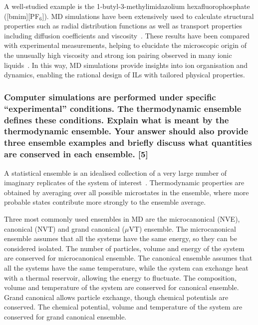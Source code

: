 \documentclass[a4paper,10pt,twocolumn]{article}
\begin{document}
A well-studied example is the 1-butyl-3-methylimidazolium hexafluorophosphate ([bmim][PF$_6$]). MD simulations have been extensively used to calculate structural properties such as radial distribution functions as well as transport properties including diffusion coefficients and viscosity~\cite{raju2009aqueous}. These results have been compared with experimental measurements, helping to elucidate the microscopic origin of the unusually high viscosity and strong ion pairing observed in many ionic liquids~\cite{zhao2008shear}. In this way, MD simulations provide insights into ion organisation and dynamics, enabling the rational design of ILs with tailored physical properties.


\subsubsection*{Computer simulations are performed under specific ``experimental'' conditions. The thermodynamic ensemble defines these conditions. Explain what is meant by the thermodynamic ensemble. Your answer should also provide three ensemble examples and briefly discuss what quantities are conserved in each ensemble. [5]}

A statistical ensemble is an idealised collection of a very large number of imaginary replicates of the system of interest~\cite{atkins2023atkins}. Thermodynamic properties are obtained by averaging over all possible microstates in the ensemble, where more probable states contribute more strongly to the ensemble average.

Three most commonly used ensembles in MD are the microcanonical (NVE), canonical (NVT) and grand canonical ($\mu$VT) ensemble. The microcanonical ensemble assumes that all the systems have the same energy, so they can be considered isolated. The number of particles, volume and energy of the system are conserved for microcanonical ensemble. The canonical ensemble assumes that all the systems have the same temperature, while the system can exchange heat with a thermal reservoir, allowing the energy to fluctuate. The composition, volume and temperature of the system are conserved for canonical ensemble. Grand canonical allows particle  exchange, though chemical potentials are conserved. The chemical potential, volume and temperature of the system are conserved for grand canonical ensemble.

\end{document}
